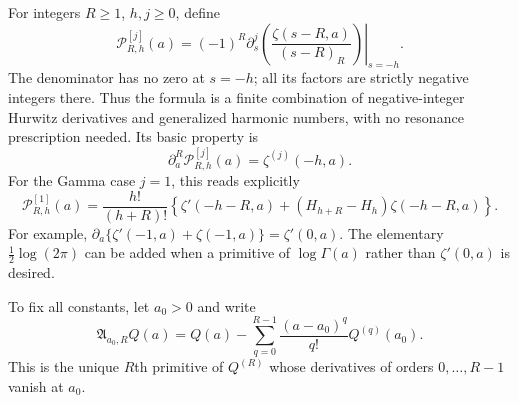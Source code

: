 \documentclass[11pt]{article}
\numberwithin{equation}{section}
\theoremstyle{definition}\newtheorem{definition}[theorem]{Definition}
\theoremstyle{remark}\newtheorem{remark}[theorem]{Remark}
\newcommand{\PP}{\mathcal P}
\begin{document}
For integers $R\ge1$, $h,j\ge0$, define
\begin{equation}\label{hsd:eq:Pgeneral}
 \PP_{R,h}^{[j]}(a)=(-1)^R
 \left.\partial_s^j\left(\frac{\zeta(s-R,a)}{(s-R)_R}\right)\right|_{s=-h}.
\end{equation}
The denominator has no zero at $s=-h$; all its factors are strictly
negative integers there. Thus the formula is a finite combination of
negative-integer Hurwitz derivatives and generalized harmonic numbers,
with no resonance prescription needed. Its basic property is
\begin{equation}\label{hsd:eq:Pderivative}
 \partial_a^R\PP_{R,h}^{[j]}(a)=\zeta^{(j)}(-h,a).
\end{equation}
For the Gamma case $j=1$, this reads explicitly
\begin{equation}\label{hsd:eq:Pexplicit}
 \PP_{R,h}^{[1]}(a)=\frac{h!}{(h+R)!}
 \left\{\zeta'(-h-R,a)+(H_{h+R}-H_h)\zeta(-h-R,a)\right\}.
\end{equation}
For example, $\partial_a\{\zeta'(-1,a)+\zeta(-1,a)\}=\zeta'(0,a)$.
The elementary $\tfrac12\log(2\pi)$ can be added when a primitive of
$\log\Gamma(a)$ rather than $\zeta'(0,a)$ is desired.

To fix all constants, let $a_0>0$ and write
\begin{equation}\label{hsd:eq:anchorop}
 \mathfrak A_{a_0,R}Q(a)=Q(a)-\sum_{q=0}^{R-1}
                    \frac{(a-a_0)^q}{q!}Q^{(q)}(a_0).
\end{equation}
This is the unique $R$th primitive of $Q^{(R)}$ whose derivatives of
orders $0,\ldots,R-1$ vanish at $a_0$.
\end{document}
